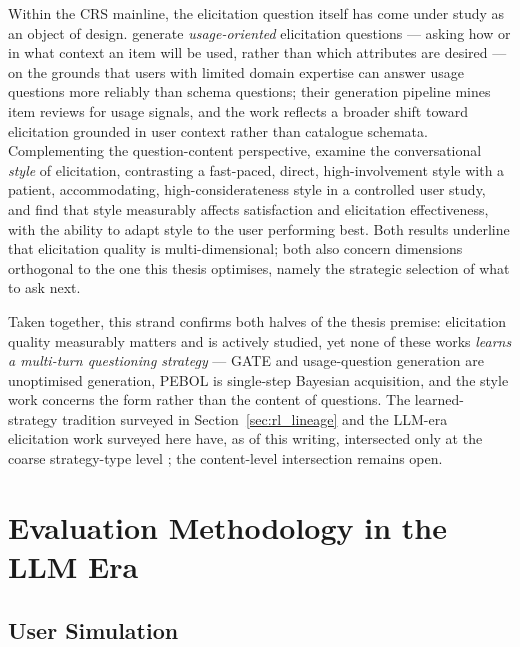 Within the CRS mainline, the elicitation question itself has come under study as an object of design. \citet{kostric2024generating} generate \textit{usage-oriented} elicitation questions — asking how or in what context an item will be used, rather than which attributes are desired — on the grounds that users with limited domain expertise can answer usage questions more reliably than schema questions; their generation pipeline mines item reviews for usage signals, and the work reflects a broader shift toward elicitation grounded in user context rather than catalogue schemata. Complementing the question-content perspective, \citet{kostric2025should} examine the conversational \textit{style} of elicitation, contrasting a fast-paced, direct, high-involvement style with a patient, accommodating, high-considerateness style in a controlled user study, and find that style measurably affects satisfaction and elicitation effectiveness, with the ability to adapt style to the user performing best. Both results underline that elicitation quality is multi-dimensional; both also concern dimensions orthogonal to the one this thesis optimises, namely the strategic selection of what to ask next.

Taken together, this strand confirms both halves of the thesis premise: elicitation quality measurably matters and is actively studied, yet none of these works \textit{learns a multi-turn questioning strategy} — GATE and usage-question generation are unoptimised generation, PEBOL is single-step Bayesian acquisition, and the style work concerns the form rather than the content of questions. The learned-strategy tradition surveyed in Section~\ref{sec:rl_lineage} and the LLM-era elicitation work surveyed here have, as of this writing, intersected only at the coarse strategy-type level \citep{zhao2025reinforced, deng2023plug}; the content-level intersection remains open.

\section{Evaluation Methodology in the LLM Era}
\label{sec:eval_norms}

\subsection{User Simulation}

